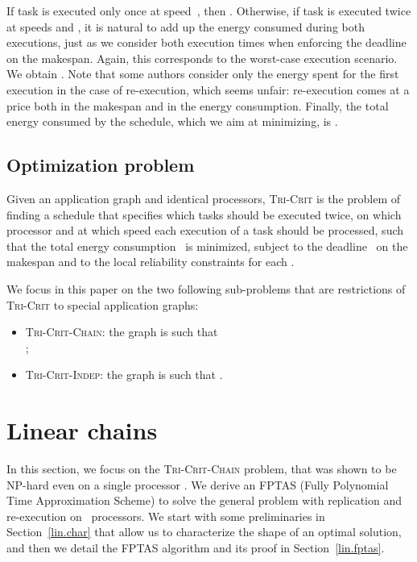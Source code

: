 \documentclass[a4paper]{article}
\theoremstyle{plain}
\theoremstyle{definition}
\theoremstyle{remark}
\newcommand{\tricrit}{\textsc{Tri-Crit}\xspace}
\newcommand{\chain}{\textsc{Tri-Crit-Chain}\xspace}
\newcommand{\indep}{\textsc{Tri-Crit-In\-dep}\xspace}
\begin{document}
If task  is executed only once at speed~, then .  Otherwise, if task  is executed twice at speeds
 and , it is natural to add up the energy consumed
during both executions, just as we consider both execution times when
enforcing the deadline on the makespan. Again, this corresponds to the
worst-case execution scenario.  We obtain .  Note that some authors \cite{Zhu06} consider only
the energy spent for the first execution in the case of re-execution,
which seems unfair: re-execution comes at a price both in the makespan
and in the energy consumption.  Finally, the total energy consumed by
the schedule, which we aim at minimizing, is .









    \subsection{Optimization problem}
\label{opt_problem}
Given an application graph  and 
identical processors, \tricrit is the problem of finding a schedule
that specifies which tasks should be executed twice, on which
processor and at which speed each execution of a task should be
processed, such that the total energy consumption~ is minimized,
subject to the deadline~ on the makespan and to the local reliability
constraints  for each .


We focus in this paper on the two following sub-problems that are 
restrictions of \tricrit to special application graphs:
\begin{itemize}
\item \chain: the graph is such that 
\\; 

\item \indep: 
  the graph is such that .
\end{itemize}






\section{Linear chains}
\label{sec.lin}

In this section, we focus on the \chain problem, that was shown to be
NP-hard even on a single processor \cite{rr7757}. We derive an FPTAS
(Fully Polynomial Time Approximation Scheme) to sol\-ve the general
problem with replication and re-execution on ~processors. We start
with some preliminaries in Section~\ref{lin.char} that allow us to
characterize the shape of an optimal solution, and then we detail the
FPTAS algorithm and its proof in Section~\ref{lin.fptas}.
\end{document}
